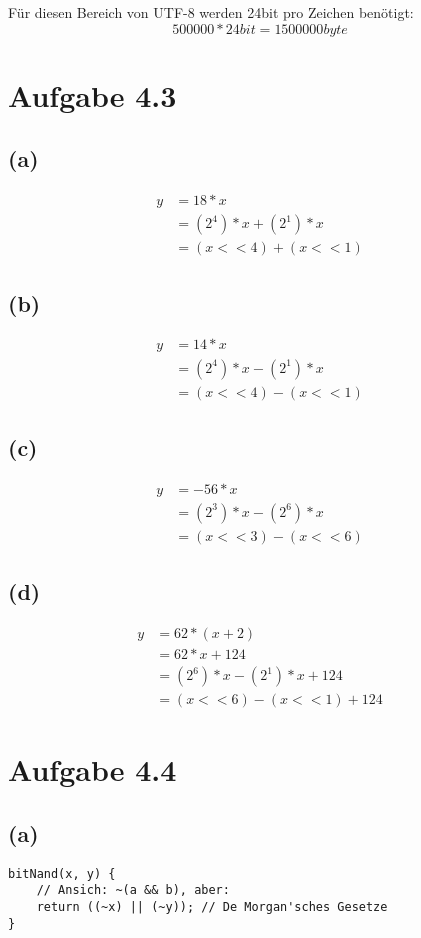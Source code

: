 \documentclass[12pt]{article}
\begin{document}
Für diesen Bereich von UTF-8 werden 24bit pro Zeichen benötigt:
\[500000 * 24bit = 1500000byte\]

\section{Aufgabe 4.3}
\subsection{(a)}
\begin{align}
y &= 18 * x\\
&= (2^4) * x + (2^1) * x\\
&= (x << 4) + (x << 1)
\end{align}
\subsection{(b)}
\begin{align}
y &= 14 * x\\
&= (2^4) * x - (2^1) * x\\
&= (x << 4) - (x << 1)
\end{align}
\subsection{(c)}
\begin{align}
y &= -56 * x\\
&= (2^3) * x - (2^6) * x\\
&= (x << 3) - (x << 6)
\end{align}
\subsection{(d)}
\begin{align}
y &= 62 * (x + 2)\\
&= 62 * x + 124\\
&= (2^6) * x - (2^1) * x + 124\\
&= (x << 6) - (x << 1) + 124
\end{align}

\section{Aufgabe 4.4}
\subsection{(a)}
\begin{verbatim}
bitNand(x, y) {
    // Ansich: ~(a && b), aber:
    return ((~x) || (~y)); // De Morgan'sches Gesetze
}
\end{verbatim}
\end{document}
